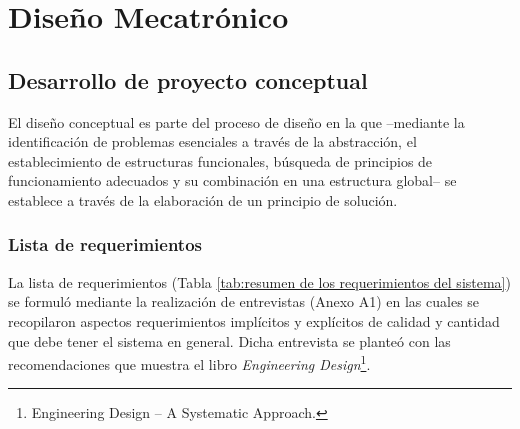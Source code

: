 
\doublespacing
\chapter{Diseño Mecatrónico}

\section{Desarrollo de proyecto conceptual}

El diseño conceptual es parte del proceso de diseño en la que --mediante la identificación de problemas esenciales a través de la abstracción, el establecimiento de estructuras funcionales, búsqueda de principios de funcionamiento adecuados y su combinación en una estructura global-- se establece a través de la elaboración de un principio de solución.\cite[p.~159]{Pahl2007}

\subsection{Lista de requerimientos}

La lista de requerimientos (Tabla \ref{tab:resumen de los requerimientos del sistema}) se formuló mediante la realización de entrevistas (Anexo  A1) en las cuales se recopilaron aspectos requerimientos implícitos y explícitos de calidad y cantidad que debe tener el sistema en general. Dicha entrevista se planteó con las recomendaciones que muestra el libro \textit{Engineering Design}\footnote{Engineering Design – A Systematic Approach.\cite[p.~144-158]{Pahl2007}}.

